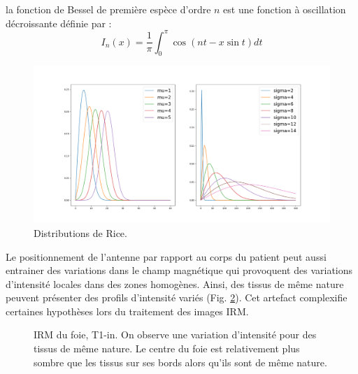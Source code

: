 la fonction de Bessel de première espèce d'ordre $n$ est une fonction à oscillation décroissante définie par :
\begin{equation}
I_n(x) = \frac{1}{\pi}\int_0^{\pi} \cos(nt - x\sin t) dt
\end{equation}
\begin{figure}
    \centering
    \includegraphics[width=\textwidth]{Images/noise_CT_2.png}
    \caption{Distributions de Rice. }
    \label{fig:MRI_Rice}
\end{figure}
Le positionnement de l'antenne par rapport au corps du patient peut aussi entrainer des variations dans le champ magnétique qui provoquent des variations d'intensité locales dans des zones homogènes. Ainsi, des tissus de même nature peuvent présenter des profils d'intensité variés (Fig. \ref{fig:MRI_variations}). Cet artefact complexifie certaines hypothèses lors du traitement des images IRM.
\begin{figure}
    \centering
    \caption{IRM du foie, T1-in. On observe une variation d'intensité pour des tissus de même nature. Le centre du foie est relativement plus sombre que les tissus sur ses bords alors qu'ils sont de même nature.}
    \label{fig:MRI_variations}
\end{figure}
